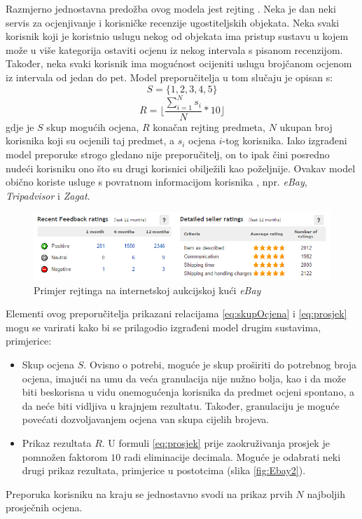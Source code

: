 \documentclass[times, utf8, diplomski, numeric]{fer}
\begin{document}
Razmjerno jednostavna predožba ovog modela jest rejting . Neka je
dan neki servis za ocjenjivanje i korisničke recenzije ugostiteljskih objekata.
Neka svaki korisnik koji je koristnio uslugu nekog od objekata ima pristup
sustavu u kojem može u više kategorija ostaviti ocjenu iz nekog intervala s
pisanom recenzijom. Također, neka svaki korisnik ima mogućnost ocijeniti uslugu
brojčanom ocjenom iz intervala od jedan do pet. Model preporučitelja u tom
slučaju je opisan s:
\begin{equation}
\label{eq:skupOcjena}
	S = \{1, 2, 3, 4, 5\}
\end{equation}
\begin{equation}
\label{eq:prosjek}
	R = \lfloor \frac{\sum_{i=1}^{N} s_i}{N} \ast 10 \rfloor
\end{equation}
gdje je $S$ skup mogućih ocjena, $R$ konačan rejting predmeta, $N$ ukupan broj
korisnika koji su ocjenili taj predmet, a $s_i$ ocjena $i$-tog korisnika. Iako
izgrađeni model preporuke strogo gledano nije preporučitelj, on to ipak čini
posredno nudeći korisniku ono što su drugi korisnici obilježili kao poželjnije.
Ovakav model obično koriste usluge s povratnom informacijom korisnika
, npr. \emph{eBay}, \emph{Tripadvisor} i \emph{Zagat}.

\begin{figure}[!htb]
	\centering
	\includegraphics[width=14.21cm]{images/neosobni/ebay1.png}
	\caption{Primjer rejtinga na internetskoj aukcijskoj kući \emph{eBay}}
	\label{fig:Ebay1}
\end{figure}

Elementi ovog preporučitelja prikazani relacijama \ref{eq:skupOcjena} i
\ref{eq:prosjek} mogu se varirati kako bi se prilagodio izgrađeni model drugim
sustavima, primjerice:
\begin{itemize}
  \item Skup ocjena $S$. Ovisno o potrebi, moguće je skup proširiti do potrebnog
  broja ocjena, imajući na umu da veća granulacija nije nužno bolja, kao i da
  može biti beskorisna u vidu onemogućenja korisnika da predmet ocjeni spontano,
  a da neće biti vidljiva u krajnjem rezultatu. Također, granulaciju je moguće
  povećati dozvoljavanjem ocjena van skupa cijelih brojeva.
  \item Prikaz rezultata $R$. U formuli \ref{eq:prosjek} prije zaokruživanja
  prosjek je pomnožen faktorom $10$ radi eliminacije decimala. Moguće je
  odabrati neki drugi prikaz rezultata, primjerice u postotcima (slika
  	\ref{fig:Ebay2}).
\end{itemize}
Preporuka korisniku na kraju se jednostavno svodi na prikaz prvih $N$ najboljih
prosječnih ocjena.
\end{document}
